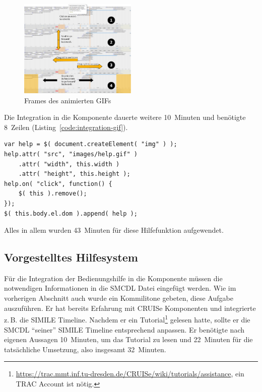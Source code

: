 \documentclass[
	headsepline,
	footsepline,
	fontsize=12pt,
	bibliography=totoc
]{scrbook}
\begin{document}
\begin{figure}[htbp]
   \centering
   \includegraphics[width=0.5\textwidth]{images/evaluation-entwicklung-gif.png}
   \caption{Frames des animierten GIFs}
   \label{figure:entwicklung-gif}
\end{figure}

Die Integration in die Komponente dauerte weitere 10~Minuten und benötigte 8~Zeilen (Listing~\ref{code:integration-gif}).

\lstset{language=Java}
\begin{lstlisting}[caption={Integration des GIFs}, label=code:integration-gif]
var help = $( document.createElement( "img" ) );
help.attr( "src", "images/help.gif" )
	.attr( "width", this.width )
	.attr( "height", this.height );
help.on( "click", function() {
	$( this ).remove();
});
$( this.body.el.dom ).append( help );
\end{lstlisting}

Alles in allem wurden 43~Minuten für diese Hilfefunktion aufgewendet.

\subsection{Vorgestelltes Hilfesystem}
\label{section:evaluation:entwicklungsaufwand:konzept}

Für die Integration der Bedienungshilfe in die Komponente müssen die notwendigen Informationen in die SMCDL Datei eingefügt werden. Wie im vorherigen Abschnitt auch wurde ein Kommilitone gebeten, diese Aufgabe auszuführen. Er hat bereits Erfahrung mit CRUISe Komponenten und integrierte z.\,B. die SIMILE Timeline. Nachdem er ein Tutorial\footnote{\url{https://trac.mmt.inf.tu-dresden.de/CRUISe/wiki/tutorials/assistance}, ein TRAC Account ist nötig.} gelesen hatte, sollte er die SMCDL \enquote{seiner} SIMILE Timeline entsprechend anpassen. Er benötigte nach eigenen Aussagen 10~Minuten, um das Tutorial zu lesen und 22~Minuten für die tatsächliche Umsetzung, also insgesamt 32~Minuten.
\end{document}
